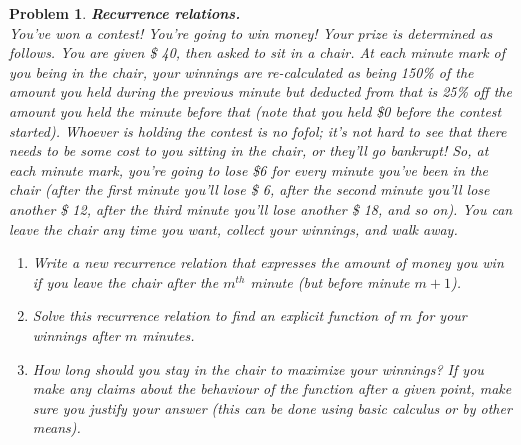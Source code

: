 \documentclass{article}
\newtheorem{problem}{Problem}
\theoremstyle{definition}
\begin{document}
\begin{problem}\textbf{Recurrence relations.}\\
You've won a contest! You're going to win money! Your prize is determined as follows. You are given \$ 40, then asked to sit in a chair. At each minute mark of you being in the chair, your winnings are re-calculated as being 150\% of the amount you held during the previous minute but deducted from that is 25\% off the amount you held the minute before that (note that you held \$0 before the contest started). Whoever is holding the contest is no fofol; it's not hard to see that there needs to be some cost to you sitting in the chair, or they'll go bankrupt! So, at each minute mark, you're going to lose \$6 for every minute you've been in the chair (after the first minute you'll lose \$ 6, after the second minute you'll lose another \$ 12, after the third minute you'll lose another \$ 18, and so on). You can leave the chair any time you want, collect your winnings, and walk away.
\begin{enumerate}[label = \alph*)]
    \item Write a new recurrence relation that expresses the amount of money you win if you leave the chair after the $m^{th}$ minute (but before minute $m+1$).
    
    \item Solve this recurrence relation to find an explicit function of $m$ for your winnings after $m$ minutes.
    
    \item How long should you stay in the chair to maximize your winnings? If you make any claims about the behaviour of the function after a given point, make sure you justify your answer (this can be done using basic calculus or by other means).
\end{enumerate}
\end{problem}
\end{document}

